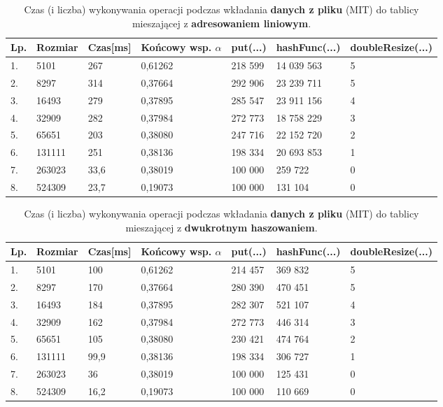 \documentclass[twoside]{article}
\begin{document}
\begin{table}[h]
\begin{tabular}{|l|l|l|l||l|l|l|}
\hline
Lp. & Rozmiar & Czas[ms] & Końcowy wsp. $\alpha$ & put(...) & hashFunc(...) & doubleResize(...) \\ \hline
1. & 5101 & 267 & 0,61262 & 218 599 & 14 039 563 & 5 \\ \hline
2. & 8297 & 314 & 0,37664  & 292 906  & 23 239 711  & 5  \\ \hline
3. & 16493 & 279 & 0,37895 & 285 547 & 23 911 156 & 4 \\ \hline
4. & 32909 & 282 & 0,37984 & 272 773 & 18 758 229 & 3 \\ \hline
5. & 65651 & 203 & 0,38080 & 247 716 & 22 152 720 & 2 \\ \hline
6. & 131111 & 251 & 0,38136 & 198 334 & 20 693 853 & 1 \\ \hline
7. & 263023 & 33,6 & 0,38019 & 100 000 & 259 722 & 0 \\ \hline
8. & 524309 & 23,7 & 0,19073 & 100 000 & 131 104 & 0 \\ \hline
\end{tabular}
\caption{Czas (i liczba) wykonywania operacji podczas wkładania \textbf{danych z pliku} (MIT) do
tablicy mieszającej z \textbf{adresowaniem liniowym}.}
\end{table}

\begin{table}[h]
\begin{tabular}{|l|l|l|l||l|l|l|}
\hline
Lp. & Rozmiar & Czas[ms] & Końcowy wsp. $\alpha$ & put(...) & hashFunc(...) & doubleResize(...) \\ \hline
1. & 5101 & 100 & 0,61262 & 214 457 & 369 832 & 5 \\ \hline
2. & 8297 & 170 & 0,37664 & 280 390 & 470 451 & 5 \\ \hline
3. & 16493 & 184 & 0,37895 & 282 307 & 521 107 & 4 \\ \hline
4. & 32909 & 162 & 0,37984 & 272 773 & 446 314 & 3 \\ \hline
5. & 65651 & 105 & 0,38080 & 230 421 & 474 764 & 2 \\ \hline
6. & 131111 & 99,9 & 0,38136 & 198 334 & 306 727 & 1 \\ \hline
7. & 263023 & 36 & 0,38019 & 100 000 & 125 431 & 0 \\ \hline
8. & 524309 & 16,2 & 0,19073 & 100 000 & 110 669 & 0 \\ \hline
\end{tabular}
\caption{Czas (i liczba) wykonywania operacji podczas wkładania \textbf{danych z pliku} (MIT) do
tablicy mieszającej z \textbf{dwukrotnym haszowaniem}.}
\end{table}
\end{document}
